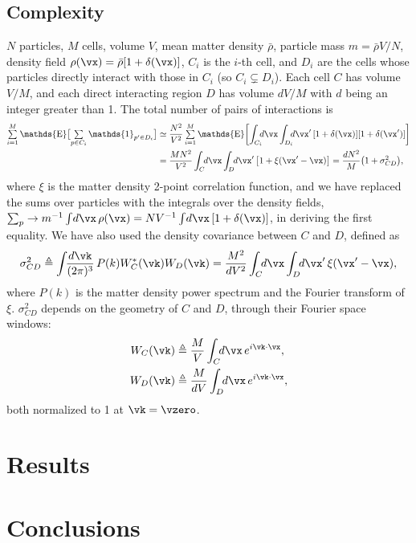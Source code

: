\documentclass[a4paper]{article}
\DeclareMathOperator*{\E}{\mathds{E}}
\DeclareMathOperator{\tsum}{{\textstyle\sum}}
\newcommand{\1}{\mathds{1}}
\renewcommand{\d}{d}
\begin{document}
\subsection{Complexity}

$N$ particles, $M$ cells, volume $V$, mean matter density
$\bar\rho$, particle mass $m = \bar\rho V / N$, density field $\rho(\vx)
= \bar\rho [1 + \delta(\vx)]$, $C_i$ is the $i$-th cell, and $D_i$ are
the cells whose particles directly interact with those in $C_i$ (so $C_i
\subsetneq D_i$).
Each cell $C$ has volume $V / M$, and each direct interacting region $D$
has volume $d V / M$ with $d$ being an integer greater than 1.
The total number of pairs of interactions is
%
\begin{align}
\tsum_{i=1}^M \E \bigl[ \tsum_{p\in C_i} \1_{p'\in D_i} \bigr]
%
&\simeq \frac{N^2}{V^2} \tsum_{i=1}^M \E \biggl[
  \int_{C_i} \!\!\!\d\vx \int_{D_i} \!\!\!\d\vx'\,
  [1 + \delta(\vx)] [1 + \delta(\vx')] \biggr] \nonumber\\
%
&= \frac{M N^2}{V^2} \int_C \!\!\d\vx \int_D \!\!\d\vx'\,
  \bigl[ 1 + \xi(\vx' - \vx) \bigr]
= \frac{d N^2}M  \bigl( 1 + \sigma^2_{CD} \bigr),
\end{align}
%
where $\xi$ is the matter density 2-point correlation function, and we
have replaced the sums over particles with the integrals over the
density fields, $\sum_p \to m^{-1} \int \!\d\vx\, \rho(\vx) = N V^{-1}
\int \!\d\vx\, [1 + \delta(\vx)]$, in deriving the first equality.
We have also used the density covariance between $C$ and $D$, defined as
%
\begin{equation}
\sigma^2_{CD} \triangleq \int \!\!\frac{\d\vk}{(2\pi)^3}\,
  P(k) W_C^*(\vk) W_D(\vk)
= \frac{M^2}{d V^2} \int_C \!\!\d\vx \int_D \!\!\d\vx'\,
  \xi(\vx' - \vx),
\end{equation}
%
where $P(k)$ is the matter density power spectrum and the Fourier
transform of $\xi$.
$\sigma^2_{CD}$ depends on the geometry of $C$ and $D$, through their
Fourier space windows:
%
\begin{align}
W_C(\vk) &\triangleq \frac{M}V \int_C \!\!\d\vx\, e^{i\vk\cdot\vx},
  \nonumber\\
W_D(\vk) &\triangleq \frac{M}{dV} \int_D \!\!\d\vx\, e^{i\vk\cdot\vx},
\end{align}
%
both normalized to 1 at $\vk=\vzero$.



\section{Results}


\section{Conclusions}








\end{document}
